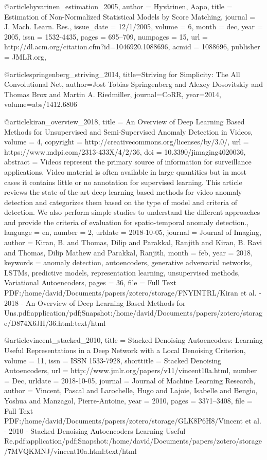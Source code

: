 \documentclass{article}
\begin{document}
@article{hyvarinen_estimation_2005,
 author = {Hyv\"{a}rinen, Aapo},
 title = {Estimation of Non-Normalized Statistical Models by Score Matching},
 journal = {J. Mach. Learn. Res.},
 issue_date = {12/1/2005},
 volume = {6},
 month = dec,
 year = {2005},
 issn = {1532-4435},
 pages = {695--709},
 numpages = {15},
 url = {http://dl.acm.org/citation.cfm?id=1046920.1088696},
 acmid = {1088696},
 publisher = {JMLR.org},
} 

@article{springenberg_striving_2014,
  title={Striving for Simplicity: The All Convolutional Net},
  author={Jost Tobias Springenberg and Alexey Dosovitskiy and Thomas Brox and Martin A. Riedmiller},
  journal={CoRR},
  year={2014},
  volume={abs/1412.6806}
}


@article{kiran_overview_2018,
	title = {An {Overview} of {Deep} {Learning} {Based} {Methods} for {Unsupervised} and {Semi}-{Supervised} {Anomaly} {Detection} in {Videos}},
	volume = {4},
	copyright = {http://creativecommons.org/licenses/by/3.0/},
	url = {https://www.mdpi.com/2313-433X/4/2/36},
	doi = {10.3390/jimaging4020036},
	abstract = {Videos represent the primary source of information for surveillance applications. Video material is often available in large quantities but in most cases it contains little or no annotation for supervised learning. This article reviews the state-of-the-art deep learning based methods for video anomaly detection and categorizes them based on the type of model and criteria of detection. We also perform simple studies to understand the different approaches and provide the criteria of evaluation for spatio-temporal anomaly detection.},
	language = {en},
	number = {2},
	urldate = {2018-10-05},
	journal = {Journal of Imaging},
	author = {Kiran, B. and Thomas, Dilip and Parakkal, Ranjith and Kiran, B. Ravi and Thomas, Dilip Mathew and Parakkal, Ranjith},
	month = feb,
	year = {2018},
	keywords = {anomaly detection, autoencoders, generative adversarial networks, LSTMs, predictive models, representation learning, unsupervised methods, Variational Autoencoders},
	pages = {36},
	file = {Full Text PDF:/home/david/Documents/papers/zotero/storage/FNYINTRL/Kiran et al. - 2018 - An Overview of Deep Learning Based Methods for Uns.pdf:application/pdf;Snapshot:/home/david/Documents/papers/zotero/storage/D874X6JH/36.html:text/html}
}

@article{vincent_stacked_2010,
	title = {Stacked {Denoising} {Autoencoders}: {Learning} {Useful} {Representations} in a {Deep} {Network} with a {Local} {Denoising} {Criterion}},
	volume = {11},
	issn = {ISSN 1533-7928},
	shorttitle = {Stacked {Denoising} {Autoencoders}},
	url = {http://www.jmlr.org/papers/v11/vincent10a.html},
	number = {Dec},
	urldate = {2018-10-05},
	journal = {Journal of Machine Learning Research},
	author = {Vincent, Pascal and Larochelle, Hugo and Lajoie, Isabelle and Bengio, Yoshua and Manzagol, Pierre-Antoine},
	year = {2010},
	pages = {3371--3408},
	file = {Full Text PDF:/home/david/Documents/papers/zotero/storage/GLK8P6H8/Vincent et al. - 2010 - Stacked Denoising Autoencoders Learning Useful Re.pdf:application/pdf;Snapshot:/home/david/Documents/papers/zotero/storage/7MVQKMNJ/vincent10a.html:text/html}
}
\end{document}
